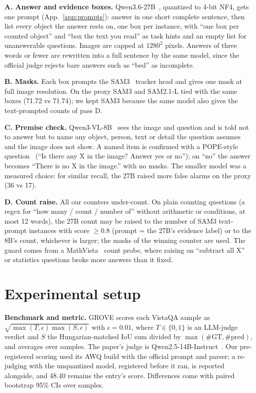 \documentclass{article}
\begin{document}
\textbf{A. Answer and evidence boxes.} Qwen3.6-27B~\cite{qwen3}, quantized to 4-bit NF4, gets one
prompt (App.~\ref{app:prompts}): answer in one short complete sentence, then list every object the answer rests on, one box per
instance, with ``one box per counted object'' and ``box the text you read'' as task hints and an empty list for unanswerable
questions. Images are capped at $1280^2$ pixels. Answers of three words or fewer are rewritten into a full sentence by the
same model, since the official judge rejects bare answers such as ``bed'' as incomplete.

\textbf{B. Masks.} Each box prompts the SAM3~\cite{sam3} tracker head and gives one mask at full image resolution. On the proxy
SAM3 and SAM2.1-L tied with the same boxes (71.72 vs 71.74); we kept SAM3 because the same model also gives the text-prompted
counts of pass D.

\textbf{C. Premise check.} Qwen3-VL-8B~\cite{qwen3vl} sees the image and question and is told not to answer but to name
any object, person, text or detail the question assumes and the image does not show. A named item is confirmed with a POPE-style
question~\cite{pope} (``Is there any X in the image? Answer yes or no''); on ``no'' the answer becomes ``There is no X in the
image.'' with no masks. The smaller model was a measured choice: for similar recall, the 27B raised more false alarms
on the proxy (36 vs 17).

\textbf{D. Count raise.} All our counters under-count. On plain counting questions (a regex for ``how many / count / number
of'' without arithmetic or conditions, at most 12 words), the 27B count may be raised to the number of SAM3 text-prompt
instances with score $\geq0.8$ (prompt = the 27B's evidence label) or to the 8B's count, whichever is larger; the masks of the
winning counter are used. The guard comes from a MathVista~\cite{mathvista} count probe, where raising on ``subtract all X''
or statistics questions broke more answers than it fixed.

\section{Experimental setup}\label{sec:setup}
\textbf{Benchmark and metric.} GROVE scores each VistaQA sample as $\sqrt{\max(T,\epsilon)\max(S,\epsilon)}$ with
$\epsilon=0.01$, where $T\in\{0,1\}$ is an LLM-judge verdict and $S$ the Hungarian-matched IoU sum divided by
$\max(\#\text{GT},\#\text{pred})$, and averages over samples. The paper's judge is Qwen2.5-14B-Instruct~\cite{qwen25}. Our
pre-registered scoring used its AWQ build with the official prompt and parser; a re-judging with the unquantized model, registered
before it ran, is reported alongside, and 48.40 remains the entry's score. Differences come with paired bootstrap 95\% CIs over samples.
\end{document}
